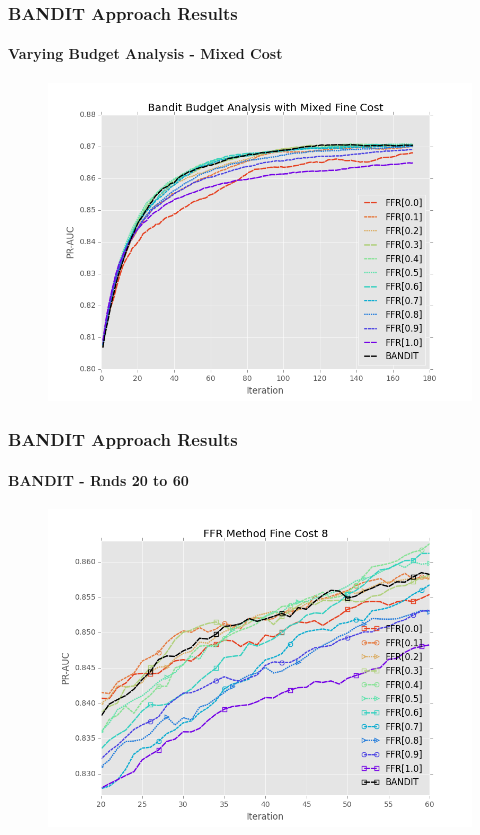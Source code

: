\documentclass{beamer}
\begin{document}
\begin{frame}
    \frametitle{BANDIT Approach Results}  %
    \framesubtitle{Varying Budget Analysis - Mixed Cost}
    \begin{figure}[!htb]
        \centering
        \includegraphics[width=0.80\columnwidth]{fig/BanditMixedCostPR}
        \label{fig:BanditMixedCostPR}
    \end{figure}
\end{frame}
\begin{frame}
    \frametitle{BANDIT Approach Results}  %
    \framesubtitle{BANDIT - Rnds 20 to 60}
    \begin{figure}[!htb]
        \centering
        \includegraphics[width=0.80\columnwidth]{fig/BANDIT_PR_Cost8_rnds20_60}
        \label{fig:BANDIT_PR_Cost8_rnds20_60}
    \end{figure}
\end{frame}
\end{document}
